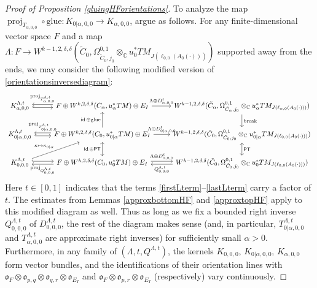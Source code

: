 \documentclass[12pt]{article}
\theoremstyle{definition}
\theoremstyle{remark}
\numberwithin{equation}{subsection}
\newcommand{\oo}{\mathfrak o}
\newcommand{\CC}{\mathbb C}
\newcommand{\PT}{\mathsf{PT}}
\newcommand{\proj}{\operatorname{proj}}
\newcommand{\id}{\operatorname{id}}
\begin{document}
\begin{proof}[Proof of Proposition \ref{gluingHForientations}]
To analyze the map ${\proj_{T_{\alpha,0,0}}}\circ{\mathrm{glue}}:K_{0|\alpha,0,0}\to K_{\alpha,0,0}$, argue as follows.  For any finite-dimensional vector space $F$ and a map $\Lambda:F\to W^{k-1,2,\delta,\delta}(\tilde C_0,\Omega^{0,1}_{\tilde C_0,j_0}\otimes_\CC u_0^\ast TM_{J(\ell_{0,0}(A_0(\cdot)))})$ supported away from the ends, we may consider the following modified version of \eqref{orientationsinversediagram}:
\begin{equation}
\begin{tikzcd}\label{orientationsinversediagramcompl}
K_{\alpha,0,0}^{\Lambda,t}\ar[hook,yshift=-0.5ex]{r}\ar[leftarrow,yshift=0.5ex]{r}{\proj_{T_{\alpha,0,0}^{\Lambda,t}}}&F\oplus W^{k,2,\delta,\delta}(C_\alpha,u_\alpha^\ast TM)\oplus E_I\ar{r}{\Lambda\oplus D_{\alpha,0,0}^t}&W^{k-1,2,\delta,\delta}(\tilde C_\alpha,\Omega^{0,1}_{\tilde C_\alpha,j_0}\otimes_\CC u_\alpha^\ast TM_{J(\ell_{\alpha,0}(A_0(\cdot)))})\ar{d}{\mathrm{break}}\\
K_{0|\alpha,0,0}^{\Lambda,t}\ar[hook,yshift=-0.5ex]{r}\ar[leftarrow,yshift=0.5ex]{r}{\proj_{T_{0|\alpha,0,0}^{\Lambda,t}}}&F\oplus W^{k,2,\delta,\delta}(C_0,u_{0|\alpha}^\ast TM)\oplus E_I\ar{u}{\id\oplus\mathrm{glue}}\ar{r}{\Lambda\oplus D_{0|\alpha,0,0}^t}&W^{k-1,2,\delta,\delta}(\tilde C_0,\Omega^{0,1}_{\tilde C_0,j_0}\otimes_\CC u_{0|\alpha}^\ast TM_{J(\ell_{0,0}(A_0(\cdot)))})\ar[leftrightarrow]{d}{\PT}\\
K_{0,0,0}^{\Lambda,t}\ar[hook,yshift=0.5ex]{r}\ar[leftarrow,yshift=-0.5ex]{r}[swap]{\proj_{Q_{0,0,0}^{\Lambda,t}}}\ar{ru}{\kappa\mapsto\kappa_{0|\alpha}}&F\oplus W^{k,2,\delta,\delta}(C_0,u_0^\ast TM)\oplus E_I\ar[leftrightarrow]{u}{\id\oplus\PT}\ar[yshift=0.5ex]{r}{\Lambda\oplus D_{0,0,0}^t}&\ar[yshift=-0.5ex]{l}{Q_{0,0,0}^{\Lambda,t}}W^{k-1,2,\delta,\delta}(\tilde C_0,\Omega^{0,1}_{\tilde C_0,j_0}\otimes_\CC u_0^\ast TM_{J(\ell_{0,0}(A_0(\cdot)))})
\end{tikzcd}
\end{equation}
Here $t\in[0,1]$ indicates that the terms \eqref{firstLterm}--\eqref{lastLterm} carry a factor of $t$.  The estimates from Lemmas \ref{approxbottomHF} and \ref{approxtopHF} apply to this modified diagram as well.  Thus as long as we fix a bounded right inverse $Q_{0,0,0}^{\Lambda,t}$ of $D_{0,0,0}^{\Lambda,t}$, the rest of the diagram makes sense (and, in particular, $T_{0|\alpha,0,0}^{\Lambda,t}$ and $T_{\alpha,0,0}^{\Lambda,t}$ are approximate right inverses) for sufficiently small $\alpha>0$.  Furthermore, in any family of $(\Lambda,t,Q^{\Lambda,t})$, the kernels $K_{0,0,0}$, $K_{0|\alpha,0,0}$, $K_{\alpha,0,0}$ form vector bundles, and the identifications of their orientation lines with $\oo_F\otimes\oo_{p,q}\otimes\oo_{q,r}\otimes\oo_{E_I}$ and $\oo_F\otimes\oo_{p,r}\otimes\oo_{E_I}$ (respectively) vary continuously.


\end{proof}
\end{document}

